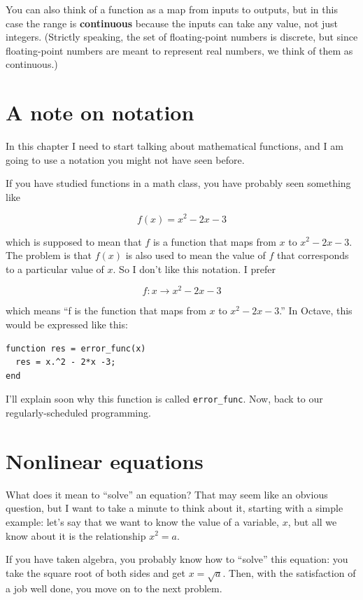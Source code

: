 \documentclass{book}
\begin{document}
You can also think of a function as a map from inputs to outputs, but
in this case the range is {\bf continuous} because the inputs can take
any value, not just integers. (Strictly speaking, the set of
floating-point numbers is discrete, but since floating-point numbers
are meant to represent real numbers, we think of them as continuous.)


\section{A note on notation}
\label{notation}

In this chapter I need to start talking about mathematical
functions, and I am going to use a notation you might not have
seen before.

If you have studied functions in a math class, you have probably
seen something like

\[ f(x) = x^2 - 2x -3 \]

which is supposed to mean that $f$ is a function that maps from
$x$ to $x^2 - 2x -3$. The problem is that $f(x)$ is also used to mean
the value of $f$ that corresponds to a particular value of $x$. So I
don't like this notation. I prefer

\[ f : x \to x^2 - 2x -3 \]

which means ``f is the function that maps from
$x$ to $x^2 - 2x -3$.'' In Octave, this would be expressed
like this:

\begin{verbatim}
function res = error_func(x)
  res = x.^2 - 2*x -3;
end
\end{verbatim}

I'll explain soon why this function is called {\tt error\_func}.
Now, back to our regularly-scheduled programming.



\section{Nonlinear equations}

What does it mean to ``solve'' an equation? That may seem like an
obvious question, but I want to take a minute to think about it,
starting with a simple example: let's say that we want to know the
value of a variable, $x$, but all we know about it is the relationship
$x^2 = a$.

If you have taken algebra, you probably know how to ``solve'' this
equation: you take the square root of both sides and get
$x = \sqrt{a}$. Then, with the satisfaction of a job well done,
you move on to the next problem.
\end{document}
